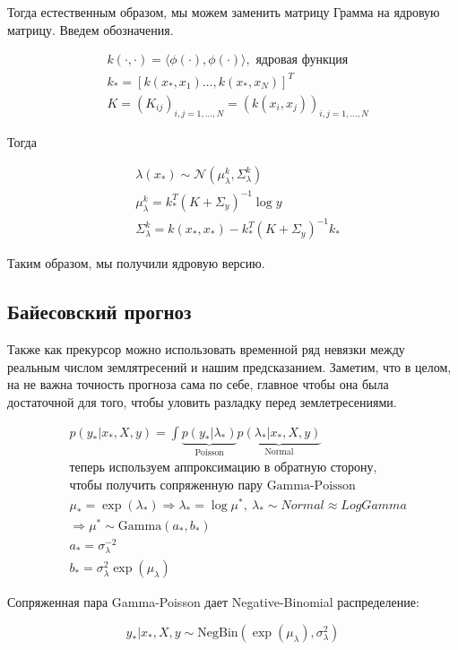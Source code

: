 Тогда естественным образом, мы можем заменить матрицу Грамма на ядровую матрицу. Введем обозначения.

\begin{equation*}
\begin{aligned}
& k(\cdotp, \cdotp) = \langle \phi(\cdotp), \phi(\cdotp) \rangle, \text{ ядровая функция } \\
& k_{*} = [k(x_{*}, x_1)\dots,  k(x_{*}, x_N )]^T \\
& K = \left(K_{ij}\right)_{i,j=1,\dots, N} = \left(k(x_i, x_j)\right)_{i,j=1,\dots, N}
\end{aligned}
\end{equation*}

Тогда

\begin{equation*}
\begin{aligned}
& \lambda(x_{*}) \sim \mathcal{N}\left(\mu_{\lambda}^{k}, \Sigma_{\lambda}^{k} \right) \\
& \mu_{\lambda}^{k} = k_{*}^T(K+\Sigma_{y})^{-1}\log y \\
& \Sigma_{\lambda}^{k} = k(x_{*}, x_{*}) -  k_{*}^T(K+\Sigma_{y})^{-1}k_{*}
\end{aligned}
\end{equation*}

Таким образом, мы получили ядровую версию.

\subsection{Байесовский прогноз}

Также как прекурсор можно использовать временной ряд невязки между реальным числом землятресений и нашим предсказанием. Заметим, что в целом, на не важна точность прогноза сама по себе, главное чтобы она была достаточной для того, чтобы уловить разладку перед землетресениями.

\begin{equation*}
\begin{aligned}
& p(y_{*}|x_{*}, X, y) = \int \underbrace{p(y_{*}|\lambda_{*})}_{\text{ Poisson }} \underbrace{p(\lambda_{*}|x_{*}, X, y)}_{\text{Normal}} \\
& \text{теперь используем аппроксимацию в обратную сторону,} \\
& \text{чтобы получить сопряженную пару Gamma-Poisson} \\
& \mu_{*} = \exp(\lambda_{*}) \Rightarrow  \lambda_{*} = \log\mu^{*},~\lambda_{*} \sim Normal \approx LogGamma  \\
& \Rightarrow \mu^{*}\sim \text{Gamma}(a_{*}, b_{*}) \\
& a_{*}  =  \sigma_{\lambda}^{-2} \\ 
& b_{*} =  \sigma_{\lambda}^2\exp(\mu_{\lambda})\ \
\end{aligned}
\end{equation*}

Сопряженная пара Gamma-Poisson дает Negative-Binomial распределение:

$$
y_{*}|x_{*}, X, y \sim \text{NegBin}(\exp(\mu_{\lambda}), \sigma_{\lambda}^2)
$$